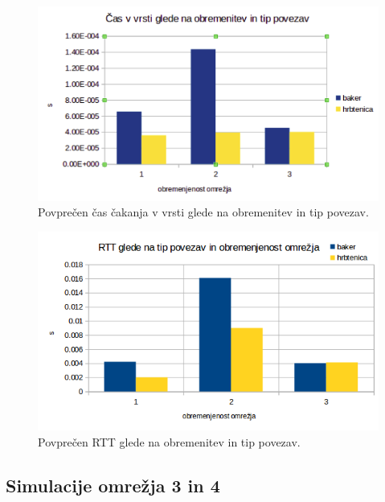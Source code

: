\documentclass[11pt, a4paper, slovene]{book}
\begin{document}
\begin{figure}[h]
	\centering
	\includegraphics[width=\textwidth]{casObremenitevTip.png}
	\caption{Povprečen čas čakanja v vrsti glede na obremenitev in tip povezav.}
	\label{cOT}	
\end{figure}

\begin{figure}[H]
	\centering
	\includegraphics[width=\textwidth]{rttPovezaveObr.png}
	\caption{Povprečen RTT glede na obremenitev in tip povezav.}
	\label{rOT}	
\end{figure}


\subsection{Simulacije omrežja 3 in 4}
\end{document}
